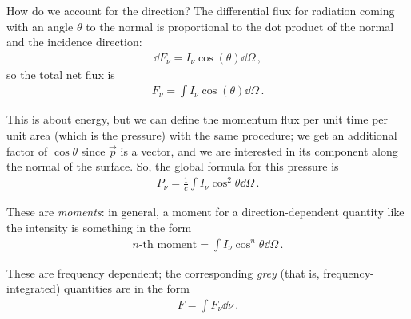 \documentclass[main.tex]{subfiles}
\begin{document}
How do we account for the direction? 
The differential flux for radiation coming with an angle \(\theta \) to the normal is proportional to the dot product of the normal and the incidence direction:
%
\begin{align}
\dd{F_{\nu } } = I_{\nu  } \cos(\theta ) \dd{\Omega }
\,,
\end{align}
%
so the total net flux is 
%
\begin{align}
F_{\nu } = \int I_{\nu } \cos(\theta ) \dd{\Omega }
\,.
\end{align}

This is about energy, but we can define the momentum flux per unit time per unit area (which is the pressure) with the same procedure; we get an additional factor of \(\cos \theta \) since \(\vec{p}\) is a vector, and we are interested in its component along the normal of the surface.
So, the global formula for this pressure is 
%
\begin{align}
P_{\nu } = \frac{1}{c} \int I_{\nu } \cos^2\theta \dd{\Omega } 
\,.
\end{align}

These are \emph{moments}: in general, a moment for a direction-dependent quantity like the intensity is something in the form 
%
\begin{align}
\text{\(n\)-th moment} = \int I_{\nu } \cos^{n} \theta \dd{\Omega }
\,.
\end{align}

These are frequency dependent; the corresponding \emph{grey} (that is, frequency-integrated) quantities are in the form 
%
\begin{align}
F = \int F_{\nu } \dd{\nu }
\,.
\end{align}
\end{document}
